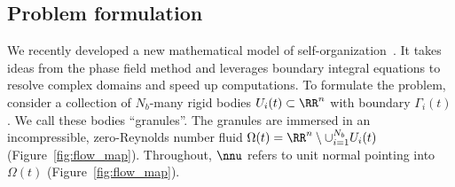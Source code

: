 \subsection{Problem formulation}
We recently developed a new mathematical model of
self-organization~\cite{FuQuRyYo22,fu-ryh-qua-you2022,Fu2018_SIAM}.
It takes ideas from the phase field method and leverages boundary
integral equations to resolve complex domains and speed up computations.
To formulate the problem, consider a collection of $N_b$-many rigid
bodies $U_i(t) \subset \RR^n$ with boundary $\Gamma_i(t)$. We call these
bodies ``granules''. The granules are immersed in an incompressible,
zero-Reynolds number fluid $\Omega(t) = \RR^n \setminus \cup_{i=1}^{N_b}
U_i(t)$ (Figure~\ref{fig:flow_map}).
Throughout, $\nnu$ refers to unit
normal pointing into $\Omega(t)$ (Figure~\ref{fig:flow_map}).

